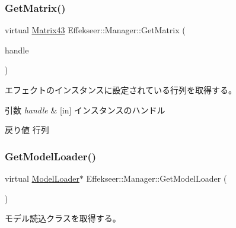 \subsubsection{\texorpdfstring{Get\+Matrix()}{GetMatrix()}}
{\footnotesize\ttfamily virtual \mbox{\hyperlink{struct_effekseer_1_1_matrix43}{Matrix43}} Effekseer\+::\+Manager\+::\+Get\+Matrix (\begin{DoxyParamCaption}\item[{\mbox{\hyperlink{namespace_effekseer_afba58b8d812da862190e9bbfc040824a}{Handle}}}]{handle }\end{DoxyParamCaption})\hspace{0.3cm}{\ttfamily [pure virtual]}}



エフェクトのインスタンスに設定されている行列を取得する。 


\begin{DoxyParams}{引数}
{\em handle} & \mbox{[}in\mbox{]} インスタンスのハンドル \\
\hline
\end{DoxyParams}
\begin{DoxyReturn}{戻り値}
行列 
\end{DoxyReturn}
\mbox{\label{class_effekseer_1_1_manager_a6afd86fbdfb8b3e6d12c9a80bfb3f80e}} 
\subsubsection{\texorpdfstring{Get\+Model\+Loader()}{GetModelLoader()}}
{\footnotesize\ttfamily virtual \mbox{\hyperlink{class_effekseer_1_1_model_loader}{Model\+Loader}}$\ast$ Effekseer\+::\+Manager\+::\+Get\+Model\+Loader (\begin{DoxyParamCaption}{ }\end{DoxyParamCaption})\hspace{0.3cm}{\ttfamily [pure virtual]}}



モデル読込クラスを取得する。 

\mbox{\label{class_effekseer_1_1_manager_a6ed37b18b9e99ff77f9608da3f4db93a}} 
